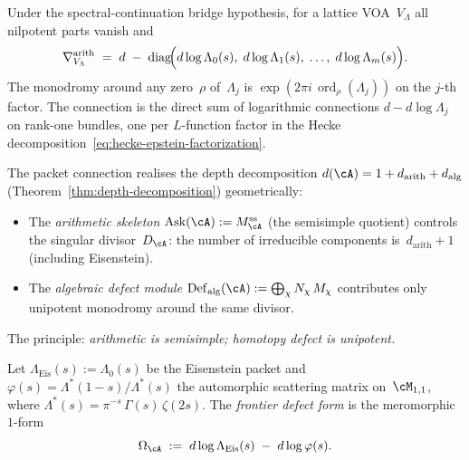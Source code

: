 \begin{corollary}%
\label{cor:lattice-packet-diagonal}%
\ClaimStatusProvedHere%
%
Under the spectral-continuation bridge hypothesis, for a lattice
VOA~$V_\Lambda$ all nilpotent parts vanish and
\[
 \nabla_{V_\Lambda}^{\mathrm{arith}}
 \;=\; d \;-\;
 \operatorname{diag}\!\Bigl(
 d\log\Lambda_0(s),\;
 d\log\Lambda_1(s),\;
 \ldots,\;
 d\log\Lambda_m(s)
 \Bigr).
\]
The monodromy around any zero~$\rho$ of~$\Lambda_j$ is
$\exp(2\pi i\,\operatorname{ord}_\rho(\Lambda_j))$ on the
$j$-th factor. The connection is the direct sum of
logarithmic connections $d - d\log\Lambda_j$ on rank-one
bundles, one per $L$-function factor in the Hecke
decomposition~\eqref{eq:hecke-epstein-factorization}.
\end{corollary}

\begin{remark}%
\label{rem:arithmetic-homotopy-dictionary}%
%
%
The packet connection realises the depth decomposition
$d(\cA) = 1 + d_{\mathrm{arith}} + d_{\mathrm{alg}}$
\textup{(}Theorem~\textup{\ref{thm:depth-decomposition}}\textup{)}
geometrically:
\begin{itemize}[nosep]
\item The \emph{arithmetic skeleton}
 $\operatorname{Ask}(\cA) := M_\cA^{\mathrm{ss}}$
 \textup{(}the semisimple quotient\textup{)}
 controls the singular divisor~$D_\cA$:
 the number of irreducible components
 is~$d_{\mathrm{arith}} + 1$ \textup{(}including Eisenstein\textup{)}.
\item The \emph{algebraic defect module}
 $\operatorname{Def}_{\mathrm{alg}}(\cA)
 := \bigoplus_\chi N_\chi\,M_\chi$
 contributes only unipotent monodromy
 around the same divisor.
\end{itemize}
The principle: \emph{arithmetic is semisimple; homotopy
defect is unipotent.}
\end{remark}

\begin{definition}%
\label{def:frontier-defect-form}%
%
%
Let $\Lambda_{\mathrm{Eis}}(s) := \Lambda_0(s)$ be the
Eisenstein packet and
$\varphi(s) = \Lambda^*(1{-}s)/\Lambda^*(s)$
the automorphic scattering matrix on~$\cM_{1,1}$, where
$\Lambda^*(s) = \pi^{-s}\,\Gamma(s)\,\zeta(2s)$.
The \emph{frontier defect form} is the meromorphic $1$-form
\begin{equation}\label{eq:frontier-defect-form}
 \Omega_\cA
 \;:=\;
 d\log\Lambda_{\mathrm{Eis}}(s)
 \;-\; d\log\varphi(s).
\end{equation}
\end{definition}

